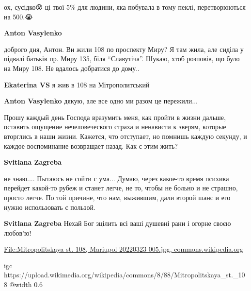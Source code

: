 \begin{itemize}
ох, сусідко😰 ці твої 5\% для людини, яка побувала в тому пеклі, перетворюються на 500.😭

\textbf{Anton Vasylenko} 

доброго дня, Антон. Ви жили 108 по проспекту Миру? Я там жила, але сиділа у
підвалі батьків пр. Миру 135, біля \enquote{Славутіча}. Шукаю, хтоб розповів, що було на
Миру 108. Не вдалось добратися до дому..

\textbf{Ekaterina VS} я жив в 108 на Мітрополитський

\textbf{Anton Vasylenko} дякую, але все одно ми разом це пережили...

\end{itemize} %


Прошу каждый день Господа вразумить меня, как пройти в жизни дальше, оставить
ощущение нечеловеческого страха и ненависти к зверям, которые вторглись в наши
жизни. Кажется, что отступает, но помнишь каждую секунду, и каждое воспоминание
возвращает назад. Как с этим жить?

\begin{itemize} %
\textbf{Svitlana Zagreba} 

не знаю.... Пытаюсь не сойти с ума... Думаю, через какое-то время психика
перейдет какой-то рубеж и станет легче, не то, чтобы не больно и не страшно,
просто легче. По той причине, что нам, выжившим, дали второй шанс и его нужно
использовать с пользой.

\textbf{Svitlana Zagreba} Нехай Бог зцілить всі ваші душевні рани і огорне своєю любов'ю! 🙏🙏🙏
\end{itemize} %


\href{https://commons.wikimedia.org/w/index.php?title=File:Mitropolitskaya_st._108,_Mariupol_20220323_005.jpg}{%
File:Mitropolitskaya st. 108, Mariupol 20220323 005.jpg, commons.wikipedia.org%
}

\ifcmt
  igc https://upload.wikimedia.org/wikipedia/commons/8/88/Mitropolitskaya_st._108%
	@width 0.6

\fi


